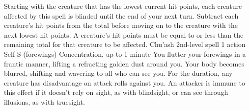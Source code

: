     Starting with the creature that has the lowest current hit points, each creature affected by this spell is blinded until the end of your next turn.
    Subtract each creature's hit points from the total before moving on to the creature with the next lowest hit points.
    A creature's hit points must be equal to or less than the remaining total for that creature to be affected.
    {Chu'ash 2nd-level spell}
    {1 action}
    {Self}
    {S (forewings)}
    {Concentration, up to 1 minute}
    You flutter your forewings in a frantic manner, lifting a refracting golden dust around you.
    Your body becomes blurred, shifting and wavering to all who can see you.
    For the duration, any creature has disadvantage on attack rolls against you.
    An attacker is immune to this effect if it doesn't rely on sight, as with blindsight, or can see through illusions, as with truesight.


